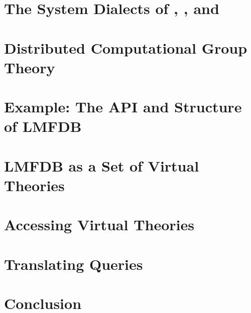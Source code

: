 \documentclass[book]{deliverablereport}
\providecommand{\lmfdb}{\textsf{LMFDB}\xspace}
\begin{document}
\section{The System Dialects of \GAP, \Sage, and \Singular}\label{sec:apit}


\section{Distributed Computational Group Theory}\label{sec:case}


\section{Example: The API and Structure of LMFDB}\label{sec:sota}


\section{\lmfdb as a Set of Virtual Theories}\label{sec:vt}


\section{Accessing Virtual Theories}\label{sec:access}


\section{Translating Queries}\label{sec:qmt}


\section{Conclusion}\label{sec:concl}

\end{document}
